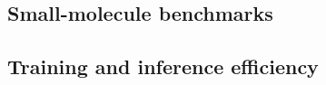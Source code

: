 \documentclass[fleqn,12pt]{wlscirep}
\begin{document}

\subsection{Small-molecule benchmarks}
\label{sec:small_mol}




\subsection{Training and inference efficiency}
\label{sec:efficiency}



\end{document}
